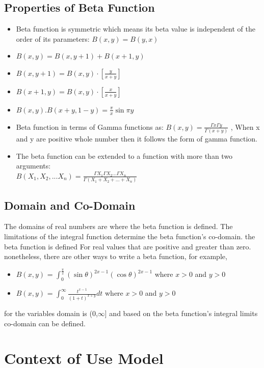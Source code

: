 \documentclass[12pt,a4paper]{report}
\begin{document}
\section{Properties of Beta Function}
    \begin{itemize}[noitemsep]
        \item Beta function is symmetric which means its beta value is independent of the order of its parameters: $B(x,y) = B(y,x)$
        \item $B(x,y) = B(x,y+1) + B(x+1,y)$
        \item $B(x,y+1) = B(x,y) \cdot [\frac{y}{x+y}]$
        \item $B(x+1,y) = B(x,y) \cdot [\frac{x}{x+y}]$
        \item $B(x,y) . B(x+y,1-y) = \frac{\pi}{x}\sin{\pi y}$
        \item Beta function in terms of Gamma functions as:
            $B(x,y)=\frac{\Gamma x \Gamma y}{\Gamma (x+y)}$ , When x and y are positive whole number then it follows the form of gamma function.
        \item The beta function can be extended to a function with more than two arguments:\\ $B(X_{1},X_{2},...X_{n}) = \frac{\Gamma X_{1} \Gamma X_{2} ... \Gamma X_{n}}{ \Gamma (X_{1} + X_{2} + ... + X_{n})}$
    \end{itemize}

\section{Domain and Co-Domain}
The domains of real numbers are where the beta function is defined. The limitations of the integral function determine the beta function's co-domain. the beta function is defined For real values that are positive and greater than zero. nonetheless, there are other ways to write a beta function, for example, \\
    \begin{itemize}
        \item $B(x,y)$ = $\int_{0}^{\frac{\pi}{2}} (\sin \theta)^{2x-1} (\cos \theta)^{2x-1}$ where $x>0$ and $y>0$
        \item $B(x,y)$ = $\int_{0}^{\infty} \frac{t^{x-1}}{(1+t)^{x+y}} dt$  where $x>0$ and $y>0$
    \end{itemize}
for the variables domain is (0,${\infty}$] and based on the beta function's integral limits co-domain can be defined.\\
\chapter{Context of Use Model}
\end{document}

